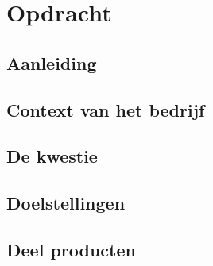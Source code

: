 \chapter{Opdracht}

\section{Aanleiding} %


\section{Context van het bedrijf} %


\section{De kwestie} %

\section{Doelstellingen} %

\section{Deel producten}




